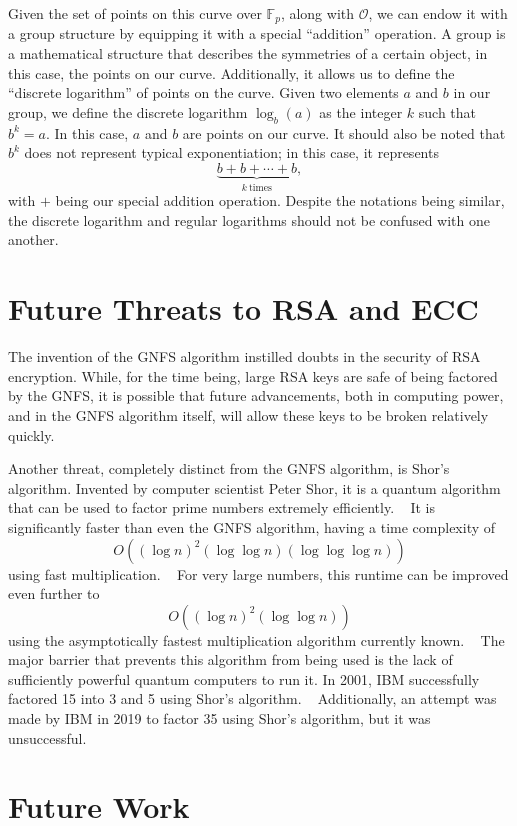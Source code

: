 \documentclass[letterpaper,twocolumn,12pt]{article}
\newcommand{\parens}[1]{\left( #1 \right)}
\begin{document}
    Given the set of points on this curve over \( \mathbb{F}_p \), along with
    \( \mathcal{O} \), we can endow it with a group structure by equipping it
    with a special ``addition'' operation.
    A group is a mathematical structure that describes the symmetries of a
    certain object, in this case, the points on our curve.
    Additionally, it allows us to define the ``discrete logarithm'' of points
    on the curve.
    Given two elements \( a \) and \( b \) in our group, we define the discrete
    logarithm \( \log_b(a) \) as the integer \( k \) such that \( b^k = a \).
    In this case, \( a \) and \( b \) are points on our curve. It should also
    be noted that \( b^k \) does not represent typical exponentiation; in this
    case, it represents
    \[ \underbrace{b + b + \cdots + b}_{k\ \textrm{times}}, \]
    with \( + \) being our special addition operation.
    Despite the notations being similar, the discrete logarithm and regular
    logarithms should not be confused with one another.

    \section*{Future Threats to RSA and ECC}

    The invention of the GNFS algorithm instilled doubts in the security of RSA
    encryption.
    While, for the time being, large RSA keys are safe of being
    factored by the GNFS, it is possible that future advancements, both in
    computing power, and in the GNFS algorithm itself, will allow these keys to
    be broken relatively quickly.

    Another threat, completely distinct from the GNFS algorithm, is Shor's
    algorithm.
    Invented by computer scientist Peter Shor, it is a quantum algorithm that
    can be used to factor prime numbers extremely efficiently.
    ~\cite{QC:Shors}
    It is significantly faster than even the GNFS algorithm, having a time
    complexity of
    \[ O\parens{ (\log n)^2(\log\log n)(\log\log\log n) } \]
    using fast multiplication.
    ~\cite{ShorsTime}
    For very large numbers, this runtime can be improved even further to
    \[ O\parens{ (\log n)^2(\log\log n)} \]
    using the asymptotically fastest multiplication algorithm currently known.
    ~\cite{FastMult}
    The major barrier that prevents this algorithm from being used is the lack
    of sufficiently powerful quantum computers to run it.
    In 2001, IBM successfully factored 15 into 3 and 5 using Shor's algorithm.
    ~\cite{2001IBM}
    Additionally, an attempt was made by IBM in 2019 to factor 35 using Shor's
    algorithm, but it was unsuccessful.
    ~\cite{Failed}
    
    \section*{Future Work}

    
    
\end{document}

